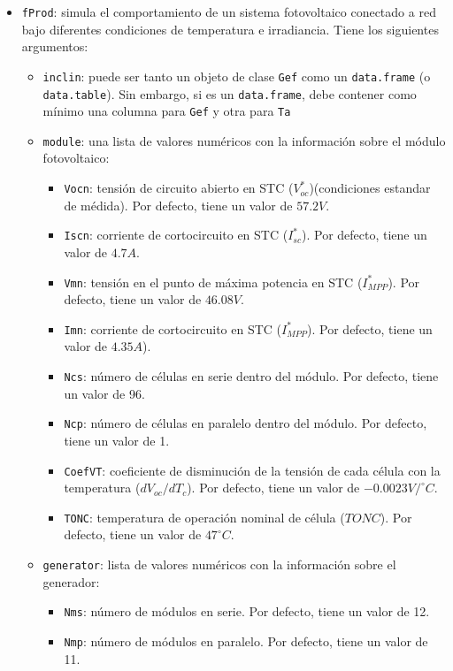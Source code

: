 \begin{itemize}
\item \texttt{fProd}: simula el comportamiento de un sistema fotovoltaico conectado a red bajo diferentes condiciones de temperatura e irradiancia. Tiene los siguientes argumentos:
\begin{itemize}
\item \texttt{inclin}: puede ser tanto un objeto de clase \texttt{Gef} como un \texttt{data.frame} (o \texttt{data.table}). Sin embargo, si es un \texttt{data.frame}, debe contener como mínimo una columna para \texttt{Gef} y otra para \texttt{Ta}
\item \texttt{module}: una lista de valores numéricos con la información sobre el módulo fotovoltaico:
\begin{itemize}
\item \texttt{Vocn}: tensión de circuito abierto en STC (\(V_{oc}^*\))(condiciones estandar de médida). Por defecto, tiene un valor de \(57.2V\).
\item \texttt{Iscn}: corriente de cortocircuito en STC (\(I_{sc}^*\)). Por defecto, tiene un valor de \(4.7A\).
\item \texttt{Vmn}: tensión en el punto de máxima potencia en STC (\(I_{MPP}^*\)). Por defecto, tiene un valor de \(46.08V\).
\item \texttt{Imn}: corriente de cortocircuito en STC (\(I_{MPP}^*\)). Por defecto, tiene un valor de \(4.35A\)).
\item \texttt{Ncs}: número de células en serie dentro del módulo. Por defecto, tiene un valor de 96.
\item \texttt{Ncp}: número de células en paralelo dentro del módulo. Por defecto, tiene un valor de 1.
\item \texttt{CoefVT}: coeficiente de disminución de la tensión  de cada célula con la temperatura (\(dV_{oc}/dT_c\)). Por defecto, tiene un valor de \(-0.0023 V/^\circ C\).
\item \texttt{TONC}: temperatura de operación nominal de célula (\(TONC\)). Por defecto, tiene un valor de \(47^\circ C\).
\end{itemize}
\item \texttt{generator}: lista de valores numéricos con la información sobre el generador:
\begin{itemize}
\item \texttt{Nms}: número de módulos en serie. Por defecto, tiene un valor de 12.
\item \texttt{Nmp}: número de módulos en paralelo. Por defecto, tiene un valor de 11.

\end{itemize}
\end{itemize}
\end{itemize}
